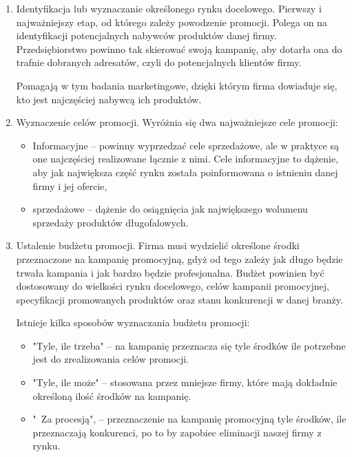 \documentclass[a4paper, 12pt]{article}
\begin{document}
\begin{enumerate}
	\item Identyfikacja lub wyznaczanie określonego rynku docelowego.
	\newline Pierwszy i najważniejszy etap, od którego zależy powodzenie promocji. Polega on na identyfikacji potencjalnych nabywców produktów danej firmy. Przedsiębiorstwo powinno tak skierować swoją kampanię, aby dotarła ona do trafnie dobranych adresatów, czyli do potencjalnych klientów firmy.
	
	Pomagają w tym badania marketingowe, dzięki którym firma dowiaduje się, kto jest najczęściej nabywcą ich produktów.

	\item Wyznaczenie celów promocji.
	\newline Wyróżnia się dwa najważniejsze cele promocji:
	\begin{itemize}
		\item Informacyjne – powinny wyprzedzać cele sprzedażowe, ale w praktyce są one najczęściej realizowane łącznie z nimi. Cele informacyjne to dążenie, aby jak największa część rynku została poinformowana o istnieniu danej firmy i jej ofercie,
		\item sprzedażowe – dążenie do osiągnięcia jak największego wolumenu sprzedaży produktów długofalowych.
	\end{itemize}
	\item Ustalenie budżetu promocji.
	\newline Firma musi wydzielić określone środki przeznaczone na kampanię promocyjną, gdyż od tego zależy jak długo będzie trwała kampania i jak bardzo będzie profesjonalna. Budżet powinien być dostosowany do wielkości rynku docelowego, celów kampanii promocyjnej, specyfikacji promowanych produktów oraz stanu konkurencji w danej branży.
	
	Istnieje kilka sposobów wyznaczania budżetu promocji:
	\begin{itemize}
		\item "Tyle, ile trzeba" – na kampanię przeznacza się tyle środków ile potrzebne jest do zrealizowania celów promocji.
		\item "Tyle, ile może" – stosowana przez mniejsze firmy, które mają dokładnie określoną ilość środków na kampanię.
		\item "\ Za procesją", – przeznaczenie na kampanię promocyjną tyle środków, ile przeznaczają konkurenci, po to by zapobiec eliminacji naszej firmy z rynku.
	\end{itemize}


\end{enumerate}
\end{document}
